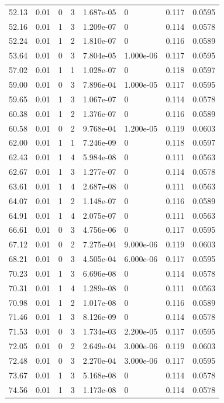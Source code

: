 \documentclass[preview]{standalone}
\begin{document}
{{{\begin{tabular}{L{1.2cm}C{1.2cm} C{0.3cm}C{0.5cm} C{1.4cm}C{1.4cm} C{1.4cm}C{1.4cm}}
  52.13  &  0.01  & 0     &  3 &  1.687e-05  & 0  & 0.117 &  0.0595   \\ 
  52.16  &  0.01  & 1     &  3 &  1.209e-07  & 0  & 0.114 &  0.0578   \\ 
  52.24  &  0.01  & 1     &  2 &  1.810e-07  & 0  & 0.116 &  0.0589   \\ 
  53.64  &  0.01  & 0     &  3 &  7.804e-05  & 1.000e-06  & 0.117 &  0.0595   \\ 
  57.02  &  0.01  & 1     &  1 &  1.028e-07  & 0  & 0.118 &  0.0597   \\ 
  59.00  &  0.01  & 0     &  3 &  7.896e-04  & 1.000e-05  & 0.117 &  0.0595   \\ 
  59.65  &  0.01  & 1     &  3 &  1.067e-07  & 0  & 0.114 &  0.0578   \\ 
  60.38  &  0.01  & 1     &  2 &  1.376e-07  & 0  & 0.116 &  0.0589   \\ 
  60.58  &  0.01  & 0     &  2 &  9.768e-04  & 1.200e-05  & 0.119 &  0.0603   \\ 
  62.00  &  0.01  & 1     &  1 &  7.246e-09  & 0  & 0.118 &  0.0597   \\ 
  62.43  &  0.01  & 1     &  4 &  5.984e-08  & 0  & 0.111 &  0.0563   \\ 
  62.67  &  0.01  & 1     &  3 &  1.277e-07  & 0  & 0.114 &  0.0578   \\ 
  63.61  &  0.01  & 1     &  4 &  2.687e-08  & 0  & 0.111 &  0.0563   \\ 
  64.07  &  0.01  & 1     &  2 &  1.148e-07  & 0  & 0.116 &  0.0589   \\ 
  64.91  &  0.01  & 1     &  4 &  2.075e-07  & 0  & 0.111 &  0.0563   \\ 
  66.61  &  0.01  & 0     &  3 &  4.756e-06  & 0  & 0.117 &  0.0595   \\ 
  67.12  &  0.01  & 0     &  2 &  7.275e-04  & 9.000e-06  & 0.119 &  0.0603   \\ 
  68.21  &  0.01  & 0     &  3 &  4.505e-04  & 6.000e-06  & 0.117 &  0.0595   \\ 
  70.23  &  0.01  & 1     &  3 &  6.696e-08  & 0  & 0.114 &  0.0578   \\ 
  70.31  &  0.01  & 1     &  4 &  1.289e-08  & 0  & 0.111 &  0.0563   \\ 
  70.98  &  0.01  & 1     &  2 &  1.017e-08  & 0  & 0.116 &  0.0589   \\ 
  71.46  &  0.01  & 1     &  3 &  8.126e-09  & 0  & 0.114 &  0.0578   \\ 
  71.53  &  0.01  & 0     &  3 &  1.734e-03  & 2.200e-05  & 0.117 &  0.0595   \\ 
  72.05  &  0.01  & 0     &  2 &  2.649e-04  & 3.000e-06  & 0.119 &  0.0603   \\ 
  72.48  &  0.01  & 0     &  3 &  2.270e-04  & 3.000e-06  & 0.117 &  0.0595   \\ 
  73.67  &  0.01  & 1     &  3 &  5.168e-08  & 0  & 0.114 &  0.0578   \\ 
  74.56  &  0.01  & 1     &  3 &  1.173e-08  & 0  & 0.114 &  0.0578   \\ 
\hline 
\end{tabular} 

}}}
\end{document}
